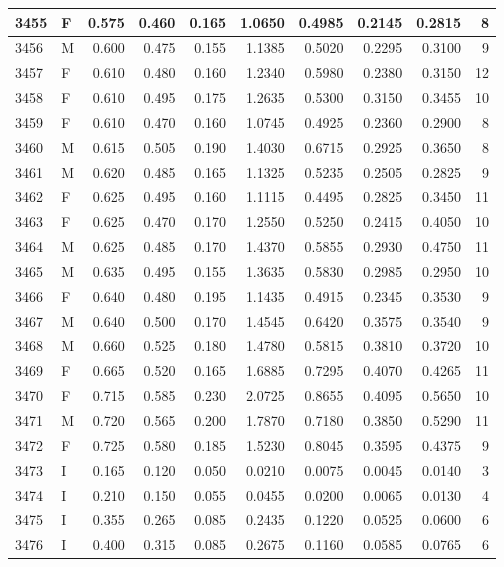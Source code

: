 \documentclass[9pt,twocolumn,twoside,]{pnas-new}
\begin{document}
\begin{tabular}{l|l|r|r|r|r|r|r|r|r}
\hline
3455 & F & 0.575 & 0.460 & 0.165 & 1.0650 & 0.4985 & 0.2145 & 0.2815 & 8\\
\hline
3456 & M & 0.600 & 0.475 & 0.155 & 1.1385 & 0.5020 & 0.2295 & 0.3100 & 9\\
\hline
3457 & F & 0.610 & 0.480 & 0.160 & 1.2340 & 0.5980 & 0.2380 & 0.3150 & 12\\
\hline
3458 & F & 0.610 & 0.495 & 0.175 & 1.2635 & 0.5300 & 0.3150 & 0.3455 & 10\\
\hline
3459 & F & 0.610 & 0.470 & 0.160 & 1.0745 & 0.4925 & 0.2360 & 0.2900 & 8\\
\hline
3460 & M & 0.615 & 0.505 & 0.190 & 1.4030 & 0.6715 & 0.2925 & 0.3650 & 8\\
\hline
3461 & M & 0.620 & 0.485 & 0.165 & 1.1325 & 0.5235 & 0.2505 & 0.2825 & 9\\
\hline
3462 & F & 0.625 & 0.495 & 0.160 & 1.1115 & 0.4495 & 0.2825 & 0.3450 & 11\\
\hline
3463 & F & 0.625 & 0.470 & 0.170 & 1.2550 & 0.5250 & 0.2415 & 0.4050 & 10\\
\hline
3464 & M & 0.625 & 0.485 & 0.170 & 1.4370 & 0.5855 & 0.2930 & 0.4750 & 11\\
\hline
3465 & M & 0.635 & 0.495 & 0.155 & 1.3635 & 0.5830 & 0.2985 & 0.2950 & 10\\
\hline
3466 & F & 0.640 & 0.480 & 0.195 & 1.1435 & 0.4915 & 0.2345 & 0.3530 & 9\\
\hline
3467 & M & 0.640 & 0.500 & 0.170 & 1.4545 & 0.6420 & 0.3575 & 0.3540 & 9\\
\hline
3468 & M & 0.660 & 0.525 & 0.180 & 1.4780 & 0.5815 & 0.3810 & 0.3720 & 10\\
\hline
3469 & F & 0.665 & 0.520 & 0.165 & 1.6885 & 0.7295 & 0.4070 & 0.4265 & 11\\
\hline
3470 & F & 0.715 & 0.585 & 0.230 & 2.0725 & 0.8655 & 0.4095 & 0.5650 & 10\\
\hline
3471 & M & 0.720 & 0.565 & 0.200 & 1.7870 & 0.7180 & 0.3850 & 0.5290 & 11\\
\hline
3472 & F & 0.725 & 0.580 & 0.185 & 1.5230 & 0.8045 & 0.3595 & 0.4375 & 9\\
\hline
3473 & I & 0.165 & 0.120 & 0.050 & 0.0210 & 0.0075 & 0.0045 & 0.0140 & 3\\
\hline
3474 & I & 0.210 & 0.150 & 0.055 & 0.0455 & 0.0200 & 0.0065 & 0.0130 & 4\\
\hline
3475 & I & 0.355 & 0.265 & 0.085 & 0.2435 & 0.1220 & 0.0525 & 0.0600 & 6\\
\hline
3476 & I & 0.400 & 0.315 & 0.085 & 0.2675 & 0.1160 & 0.0585 & 0.0765 & 6\\

\end{tabular}
\end{document}
